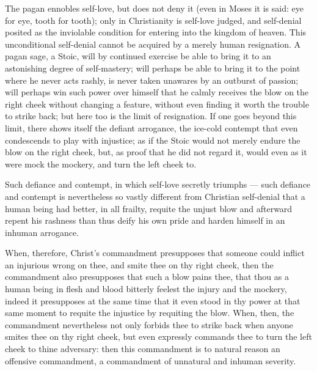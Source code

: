 \documentclass[12pt,a4paper]{book}
\begin{document}
The pagan ennobles self-love, but does not deny it (even in Moses it is said: eye for
eye, tooth for tooth); only in Christianity is self-love judged, and self-denial
posited as the inviolable condition for entering into the kingdom of heaven. This
unconditional self-denial cannot be acquired by a merely human resignation. A pagan
sage, a Stoic, will by continued exercise be able to bring it to an astonishing
degree of self-mastery; will perhaps be able to bring it to the point where he never
acts rashly, is never taken unawares by an outburst of passion; will perhaps win such
power over himself that he calmly receives the blow on the right cheek without
changing a feature, without even finding it worth the trouble to strike back; but
here too is the limit of resignation. If one goes beyond this limit, there shows
itself the defiant arrogance, the ice-cold contempt that even condescends to play
with injustice; as if the Stoic would not merely endure the blow on the right
cheek, but, as proof that he did not regard it, would even as it were mock the
mockery, and turn the left cheek to.

Such defiance and contempt, in which self-love secretly triumphs --- such defiance and
contempt is nevertheless so vastly different from Christian self-denial that a human
being had better, in all frailty, requite the unjust blow and afterward repent his
rashness than thus deify his own pride and harden himself in an inhuman arrogance.

When, therefore, Christ's commandment presupposes that someone could inflict an
injurious wrong on thee, and smite thee on thy right cheek, then the commandment also
presupposes that such a blow pains thee, that thou as a human being in flesh and blood
bitterly feelest the injury and the mockery, indeed it presupposes at the same time
that it even stood in thy power at that same moment to requite the injustice by
requiting the blow. When, then, the commandment nevertheless not only forbids thee to
strike back when anyone smites thee on thy right cheek, but even expressly commands
thee to turn the left cheek to thine adversary: then this commandment is to natural
reason an offensive commandment, a commandment of unnatural and inhuman severity.
\end{document}
